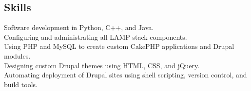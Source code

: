 \documentclass[margin,line]{resume}
\begin{document}
\begin{resume}

    \section{\mysidestyle Skills} 

    Software development in Python, C++, and Java.\vspace{1mm}\\%
    Configuring and administrating all LAMP stack components.\vspace{1mm}\\%
    Using PHP and MySQL to create custom CakePHP applications and Drupal modules.\vspace{1mm}\\%
    Designing custom Drupal themes using HTML, CSS, and jQuery.\vspace{1mm}\\%
    Automating deployment of Drupal sites using shell scripting, version control, and build tools.\vspace{1mm}\\%

\end{resume}
\end{document}
